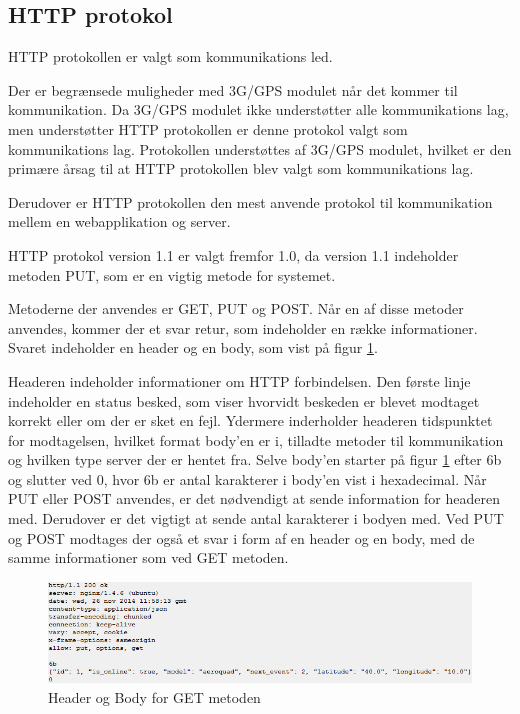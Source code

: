 \subsection{HTTP protokol}
HTTP protokollen er valgt som kommunikations led. 

Der er begrænsede muligheder med 3G/GPS modulet når det kommer til kommunikation. 
Da 3G/GPS modulet ikke understøtter alle kommunikations lag, men understøtter HTTP protokollen er denne protokol valgt som kommunikations lag.
Protokollen understøttes af 3G/GPS modulet, hvilket er den primære årsag til at HTTP protokollen blev valgt som kommunikations lag. 

Derudover er HTTP protokollen den mest anvende protokol til kommunikation mellem en webapplikation og server.
 
HTTP protokol version 1.1 er valgt fremfor 1.0, da version 1.1 indeholder metoden PUT, som er en vigtig metode for systemet.

Metoderne der anvendes er GET, PUT og POST. Når en af disse metoder anvendes, kommer der et svar retur, som indeholder en række informationer.
Svaret indeholder en header og en body, som vist på figur \ref{fig:headerbodyget}. 

Headeren indeholder informationer om HTTP forbindelsen. Den første linje indeholder en status besked, som viser hvorvidt beskeden er blevet modtaget korrekt eller om der er sket en fejl. Ydermere inderholder headeren tidspunktet for modtagelsen, hvilket format body'en er i, tilladte metoder til kommunikation og hvilken type server der er hentet fra. Selve body'en starter på figur \ref{fig:headerbodyget} efter 6b og slutter ved 0, hvor 6b er antal karakterer i body'en vist i hexadecimal. Når PUT eller POST anvendes, er det nødvendigt at sende information for headeren med. Derudover er det vigtigt at sende antal karakterer i bodyen med. Ved PUT og POST modtages der også et svar i form af en header og en body, med de samme informationer som ved GET metoden. 
\begin{figure}[H]
	\centering
	\includegraphics[width=1\textwidth]{Billeder/header_body_get.png}
	\caption{Header og Body for GET metoden}
	\label{fig:headerbodyget}
\end{figure}